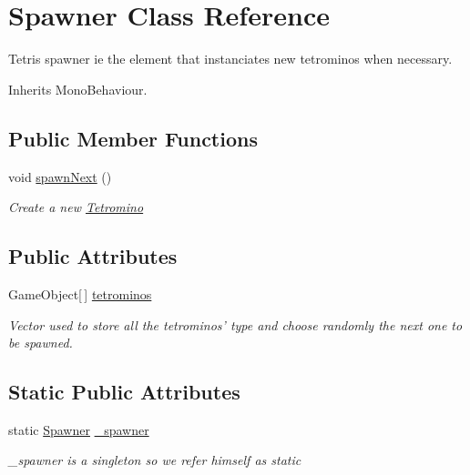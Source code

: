 \hypertarget{class_spawner}{\section{Spawner Class Reference}
\label{class_spawner}
}


Tetris spawner ie the element that instanciates new tetrominos when necessary.  




Inherits Mono\-Behaviour.

\subsection*{Public Member Functions}
\begin{DoxyCompactItemize}
\item 
void \hyperlink{class_spawner_ab4f3ef5a4f0db9252bdf470a73dc8588}{spawn\-Next} ()
\begin{DoxyCompactList}\small\item\em Create a new \hyperlink{class_tetromino}{Tetromino} \end{DoxyCompactList}\end{DoxyCompactItemize}
\subsection*{Public Attributes}
\begin{DoxyCompactItemize}
\item 
Game\-Object\mbox{[}$\,$\mbox{]} \hyperlink{class_spawner_aaab68174192a16e5a94a480e77f31916}{tetrominos}
\begin{DoxyCompactList}\small\item\em Vector used to store all the tetrominos' type and choose randomly the next one to be spawned. \end{DoxyCompactList}\end{DoxyCompactItemize}
\subsection*{Static Public Attributes}
\begin{DoxyCompactItemize}
\item 
static \hyperlink{class_spawner}{Spawner} \hyperlink{class_spawner_a1f2c8393403eb2dc335ab696aa4fe2d6}{\-\_\-spawner}
\begin{DoxyCompactList}\small\item\em \-\_\-spawner is a singleton so we refer himself as static \end{DoxyCompactList}\end{DoxyCompactItemize}


